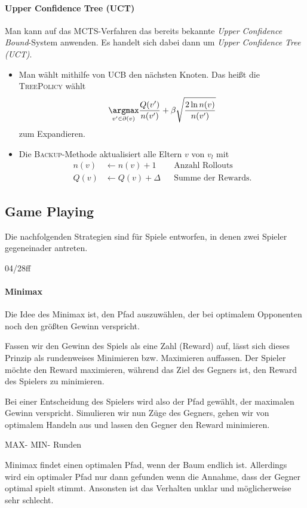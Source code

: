\documentclass[ngerman]{../LaTeX-Templates/Paper/paper}
\begin{document}
\paragraph{Upper Confidence Tree (UCT)}
Man kann auf das MCTS-Verfahren das bereits bekannte {\itshape Upper Confidence Bound}-System anwenden. Es handelt sich dabei dann um {\itshape Upper Confidence Tree (UCT)}.
\begin{itemize}
	\item Man wählt mithilfe von UCB den nächsten Knoten. Das heißt die \textsc{TreePolicy} wählt
	\begin{equation*}
		\underset{v'\in\partial(v)}\argmax\frac{Q(v')}{n(v')}+\beta\sqrt{\frac{2\ln n(v)}{n(v')}}
	\end{equation*}
	zum Expandieren.
	\item Die \textsc{Backup}-Methode aktualisiert alle Eltern $v$ von $v_l$ mit
	\begin{align*}
		n(v)&\leftarrow n(v)+1&&\text{Anzahl Rollouts}\\
		Q(v)&\leftarrow Q(v)+\Delta&&\text{Summe der Rewards.}
	\end{align*}
\end{itemize}


\subsection{Game Playing}
Die nachfolgenden Strategien sind für Spiele entworfen, in denen zwei Spieler gegeneinader antreten.


04/28ff
\paragraph{Minimax}
Die Idee des Minimax ist, den Pfad auszuwählen, der bei optimalem Opponenten noch den größten Gewinn verspricht.

Fassen wir den Gewinn des Spiels als eine Zahl (Reward) auf, lässt sich dieses Prinzip als rundenweises Minimieren bzw. Maximieren auffassen.
Der Spieler möchte den Reward maximieren, während das Ziel des Gegners ist, den Reward des Spielers zu minimieren. 

Bei einer Entscheidung des Spielers wird also der Pfad gewählt, der maximalen Gewinn verspricht. Simulieren wir nun Züge des Gegners, gehen wir von optimalem Handeln aus und lassen den Gegner den Reward minimieren. 

MAX- MIN- Runden



Minimax findet einen optimalen Pfad, wenn der Baum endlich ist.
Allerdings wird ein optimaler Pfad nur dann gefunden wenn die Annahme, dass der Gegner optimal spielt stimmt. Ansonsten ist das Verhalten unklar und möglicherweise sehr schlecht.
\end{document}
